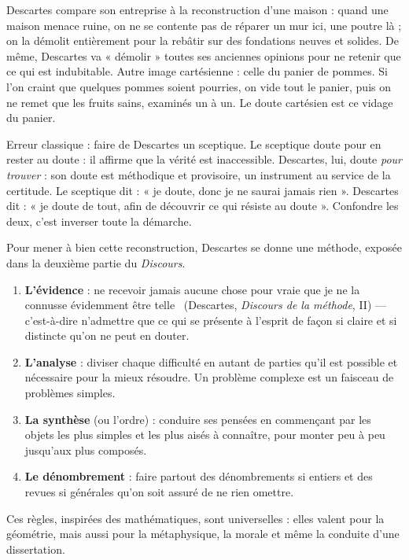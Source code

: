 \documentclass[11pt]{article}
\newcommand{\cle}[1]{{\popxbold\color{popdark}#1}}
\newcounter{popsec}
\newcounter{popsub}
\newcommand{\courssub}[1]{%
  \stepcounter{popsub}%
  \par\vspace{9pt}\noindent{\popxbold\fontsize{11.5}{13}\selectfont\color{popink}{\color{poporange}\thepopsec.\thepopsub}\hspace{6pt}#1}\par\nopagebreak\vspace{4pt}
}
\begin{document}
\begin{exemplebox}
Descartes compare son entreprise à la reconstruction d'une maison : quand une maison menace ruine, on ne se contente pas de réparer un mur ici, une poutre là ; on la démolit entièrement pour la rebâtir sur des fondations neuves et solides. De même, Descartes va « démolir » toutes ses anciennes opinions pour ne retenir que ce qui est indubitable. Autre image cartésienne : celle du panier de pommes. Si l'on craint que quelques pommes soient pourries, on vide tout le panier, puis on ne remet que les fruits sains, examinés un à un. Le doute cartésien est ce vidage du panier.
\end{exemplebox}

\begin{attention}
Erreur classique : faire de Descartes un sceptique. Le \cle{sceptique} doute pour en rester au doute : il affirme que la vérité est inaccessible. Descartes, lui, doute \emph{pour trouver} : son doute est \cle{méthodique} et provisoire, un instrument au service de la certitude. Le sceptique dit : « je doute, donc je ne saurai jamais rien ». Descartes dit : « je doute de tout, afin de découvrir ce qui résiste au doute ». Confondre les deux, c'est inverser toute la démarche.
\end{attention}

\courssub{Les quatre règles de la méthode}

Pour mener à bien cette reconstruction, Descartes se donne une méthode, exposée dans la deuxième partie du \emph{Discours}.

\begin{methode}
\begin{enumerate}
\item \textbf{L'évidence} : \guillemotleft ne recevoir jamais aucune chose pour vraie que je ne la connusse évidemment être telle \guillemotright\ (Descartes, \emph{Discours de la méthode}, II) — c'est-à-dire n'admettre que ce qui se présente à l'esprit de façon si claire et si distincte qu'on ne peut en douter.
\item \textbf{L'analyse} : diviser chaque difficulté en autant de parties qu'il est possible et nécessaire pour la mieux résoudre. Un problème complexe est un faisceau de problèmes simples.
\item \textbf{La synthèse} (ou l'ordre) : conduire ses pensées en commençant par les objets les plus simples et les plus aisés à connaître, pour monter peu à peu jusqu'aux plus composés.
\item \textbf{Le dénombrement} : faire partout des dénombrements si entiers et des revues si générales qu'on soit assuré de ne rien omettre.
\end{enumerate}
Ces règles, inspirées des mathématiques, sont universelles : elles valent pour la géométrie, mais aussi pour la métaphysique, la morale et même la conduite d'une dissertation.
\end{methode}
\end{document}
